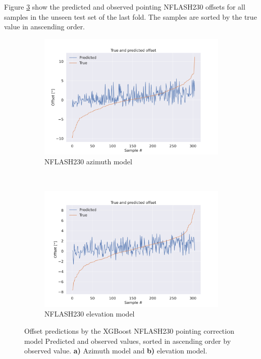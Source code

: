 Figure \ref{fig:sortpred_selected_result_xgb} show the predicted and observed pointing NFLASH230 offsets for all samples in the unseen test set of the last fold.
The samples are sorted by the true value in anscending order.


\begin{figure}[H]
    \centering
    \begin{subfigure}[t]{\textwidth}
        \centering
        \includegraphics[width=\textwidth]{Results/sortpred_XGB_ds2_tp5_k30_uncorr_az_test.pdf}
        \caption{NFLASH230 azimuth model}
        \label{subfig:sortpred_lastfold_nflash230_az}
    \end{subfigure}
    \\
    \begin{subfigure}[t]{\textwidth}
       \centering
       \includegraphics[width=1\textwidth]{Results/sortpred_XGB_ds2_tp5_k40_uncorr_el_test.pdf}
       \caption{NFLASH230 elevation model}
       \label{subfig:sortpred_lastfold_nflash230_el}
    \end{subfigure}
    \caption{Offset predictions by the XGBoost NFLASH230 pointing correction model
     Predicted and observed values, sorted in ascending order by observed value. \textbf{a)} Azimuth model and \textbf{b)} elevation model.}
    \label{fig:sortpred_selected_result_xgb}
\end{figure}



